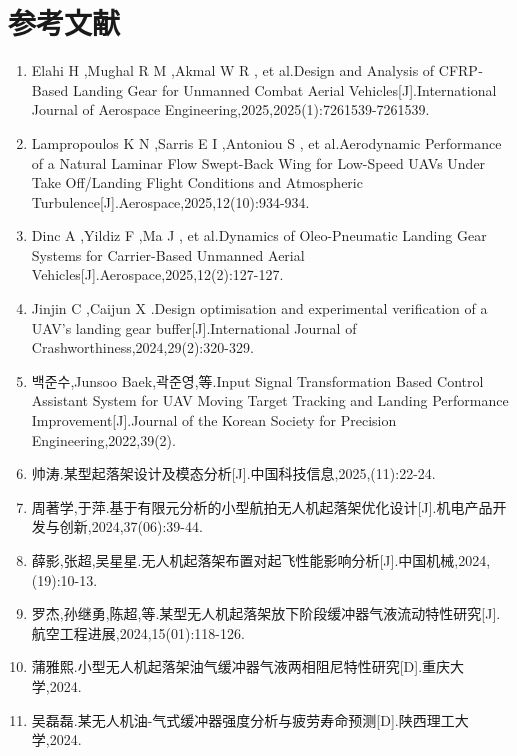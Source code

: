 
\clearpage
\chapter*{参考文献}
\begingroup
\small
\sloppy
\begin{enumerate}
\item \hypertarget{ref:1}{}Elahi H ,Mughal R M ,Akmal W R , et al.Design and Analysis of CFRP‐Based Landing Gear for Unmanned Combat Aerial Vehicles[J].International Journal of Aerospace Engineering,2025,2025(1):7261539-7261539.
\item \hypertarget{ref:2}{}Lampropoulos K N ,Sarris E I ,Antoniou S , et al.Aerodynamic Performance of a Natural Laminar Flow Swept-Back Wing for Low-Speed UAVs Under Take Off/Landing Flight Conditions and Atmospheric Turbulence[J].Aerospace,2025,12(10):934-934.
\item \hypertarget{ref:3}{}Dinc A ,Yildiz F ,Ma J , et al.Dynamics of Oleo-Pneumatic Landing Gear Systems for Carrier-Based Unmanned Aerial Vehicles[J].Aerospace,2025,12(2):127-127.
\item \hypertarget{ref:4}{}Jinjin C ,Caijun X .Design optimisation and experimental verification of a UAV's landing gear buffer[J].International Journal of Crashworthiness,2024,29(2):320-329.
\item \hypertarget{ref:5}{}백준수,Junsoo Baek,곽준영,等.Input Signal Transformation Based Control Assistant System for UAV Moving Target Tracking and Landing Performance Improvement[J].Journal of the Korean Society for Precision Engineering,2022,39(2).
\item \hypertarget{ref:6}{}帅涛.某型起落架设计及模态分析[J].中国科技信息,2025,(11):22-24.
\item \hypertarget{ref:7}{}周著学,于萍.基于有限元分析的小型航拍无人机起落架优化设计[J].机电产品开发与创新,2024,37(06):39-44.
\item \hypertarget{ref:8}{}薛影,张超,吴星星.无人机起落架布置对起飞性能影响分析[J].中国机械,2024,(19):10-13.
\item \hypertarget{ref:9}{}罗杰,孙继勇,陈超,等.某型无人机起落架放下阶段缓冲器气液流动特性研究[J].航空工程进展,2024,15(01):118-126.
\item \hypertarget{ref:10}{}蒲雅熙.小型无人机起落架油气缓冲器气液两相阻尼特性研究[D].重庆大学,2024.
\item \hypertarget{ref:11}{}吴磊磊.某无人机油-气式缓冲器强度分析与疲劳寿命预测[D].陕西理工大学,2024.

\end{enumerate}
